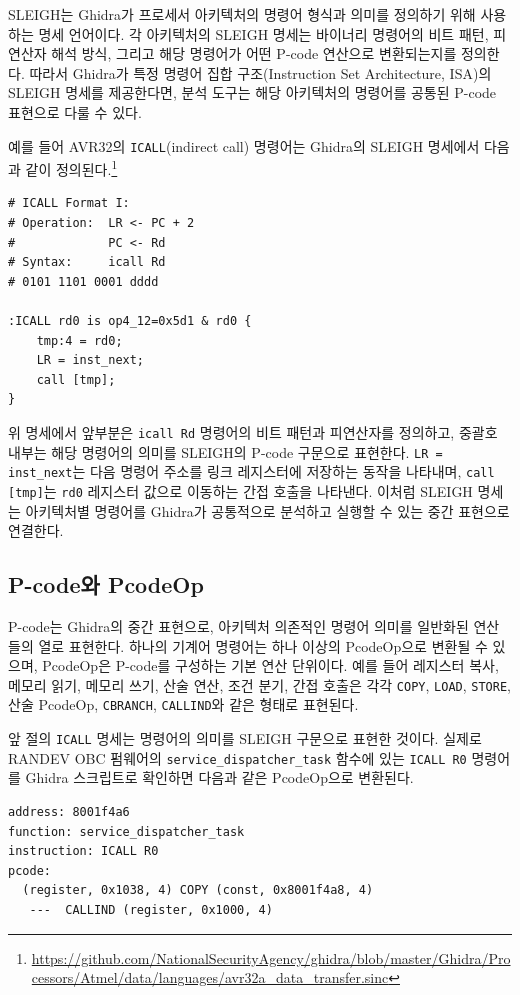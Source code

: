 \documentclass[master,korean,final]{kaist-ucs}
\begin{document}
SLEIGH는 Ghidra가 프로세서 아키텍처의 명령어 형식과 의미를 정의하기 위해 사용하는 명세 언어이다\cite{SLEIGH}. 각 아키텍처의 SLEIGH 명세는 바이너리 명령어의 비트 패턴, 피연산자 해석 방식, 그리고 해당 명령어가 어떤 P-code 연산으로 변환되는지를 정의한다. 따라서 Ghidra가 특정 명령어 집합 구조(Instruction Set Architecture, ISA)의 SLEIGH 명세를 제공한다면, 분석 도구는 해당 아키텍처의 명령어를 공통된 P-code 표현으로 다룰 수 있다.

예를 들어 AVR32의 \texttt{ICALL}(indirect call) 명령어는 Ghidra의 SLEIGH 명세에서 다음과 같이 정의된다.\footnote{\url{https://github.com/NationalSecurityAgency/ghidra/blob/master/Ghidra/Processors/Atmel/data/languages/avr32a_data_transfer.sinc}}

\begin{verbatim}
# ICALL Format I:
# Operation:  LR <- PC + 2
#             PC <- Rd
# Syntax:     icall Rd
# 0101 1101 0001 dddd

:ICALL rd0 is op4_12=0x5d1 & rd0 {
    tmp:4 = rd0;
    LR = inst_next;
    call [tmp];
}
\end{verbatim}

위 명세에서 앞부분은 \texttt{icall Rd} 명령어의 비트 패턴과 피연산자를 정의하고, 중괄호 내부는 해당 명령어의 의미를 SLEIGH의 P-code 구문으로 표현한다. \texttt{LR = inst\_next}는 다음 명령어 주소를 링크 레지스터에 저장하는 동작을 나타내며, \texttt{call [tmp]}는 \texttt{rd0} 레지스터 값으로 이동하는 간접 호출을 나타낸다. 이처럼 SLEIGH 명세는 아키텍처별 명령어를 Ghidra가 공통적으로 분석하고 실행할 수 있는 중간 표현으로 연결한다.

\subsection{P-code와 PcodeOp}

P-code는 Ghidra의 중간 표현으로, 아키텍처 의존적인 명령어 의미를 일반화된 연산들의 열로 표현한다. 하나의 기계어 명령어는 하나 이상의 PcodeOp으로 변환될 수 있으며, PcodeOp은 P-code를 구성하는 기본 연산 단위이다. 예를 들어 레지스터 복사, 메모리 읽기, 메모리 쓰기, 산술 연산, 조건 분기, 간접 호출은 각각 \texttt{COPY}, \texttt{LOAD}, \texttt{STORE}, 산술 PcodeOp, \texttt{CBRANCH}, \texttt{CALLIND}와 같은 형태로 표현된다.

앞 절의 \texttt{ICALL} 명세는 명령어의 의미를 SLEIGH 구문으로 표현한 것이다. 실제로 RANDEV OBC 펌웨어의 \texttt{service\_dispatcher\_task} 함수에 있는 \texttt{ICALL R0} 명령어를 Ghidra 스크립트로 확인하면 다음과 같은 PcodeOp으로 변환된다.

\begin{verbatim}
address: 8001f4a6
function: service_dispatcher_task
instruction: ICALL R0
pcode:
  (register, 0x1038, 4) COPY (const, 0x8001f4a8, 4)
   ---  CALLIND (register, 0x1000, 4)
\end{verbatim}
\end{document}
